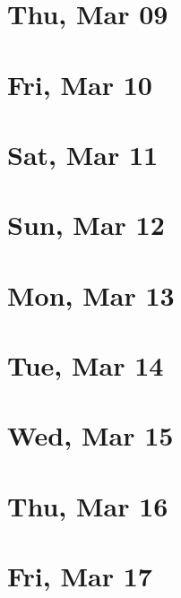 	\section{Thu, Mar 09}
		
		
	\section{Fri, Mar 10}
		
		
	\section{Sat, Mar 11}
		
		
	\section{Sun, Mar 12}
		
		
	\section{Mon, Mar 13}
		
		
	\section{Tue, Mar 14}
		
		
	\section{Wed, Mar 15}
		
		
	\section{Thu, Mar 16}
		
		
	\section{Fri, Mar 17}
		
		
